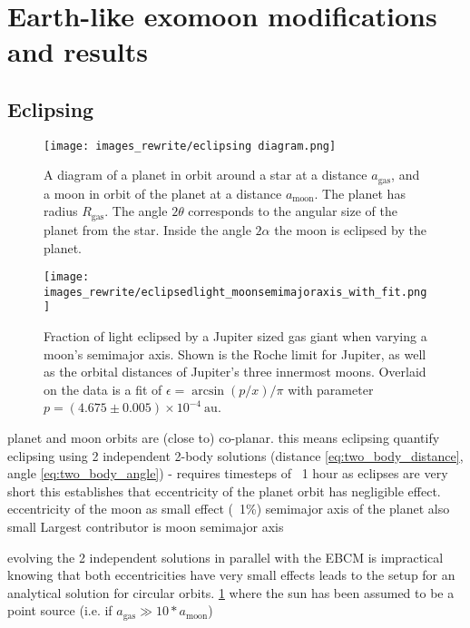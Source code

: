 \documentclass[12pt, onecolumn]{revtex4-2}    %
\begin{document}
\section{Earth-like exomoon modifications and results} \label{sec:Exomoons}
%
\subsection{Eclipsing} \label{ssec:InvEclipsing}
%
\begin{figure}[t]
  \texttt{[image: images\_rewrite/eclipsing diagram.png]}
  \caption{
    A diagram of a planet in orbit around a star at a distance $a_{\text{gas}}$, and a moon in orbit of the planet at a distance $a_{\text{moon}}$.
    The planet has radius $R_\text{gas}$.
    The angle $2\theta$ corresponds to the angular size of the planet from the star.
    Inside the angle $2\alpha$ the moon is eclipsed by the planet.
  }
  \label{fig:quantitative_eclipsing}
\end{figure}

\begin{figure}[t]
  \texttt{[image: images\_rewrite/eclipsedlight\_moonsemimajoraxis\_with\_fit.png]}
  \caption{
    Fraction of light eclipsed by a Jupiter sized gas giant when varying a moon's semimajor axis.
    Shown is the Roche limit for Jupiter, as well as the orbital distances of Jupiter's three innermost moons.
    Overlaid on the data is a fit of $\epsilon = \arcsin(p/x)/\pi$ with parameter $p = (4.675\pm0.005)\times 10^{-4}\ \text{au}$.
  }
  \label{fig:quantitative_eclipsing_moon_semimajor_axis}
\end{figure}

planet and moon orbits are (close to) co-planar.
this means eclipsing
quantify eclipsing using 2 independent 2-body solutions (distance \eqref{eq:two_body_distance}, angle \eqref{eq:two_body_angle})
 - requires timesteps of ~1 hour as eclipses are very short
this establishes that eccentricity of the planet orbit has negligible effect.
eccentricity of the moon as small effect (~1\%)
semimajor axis of the planet also small
Largest contributor is moon semimajor axis

evolving the 2 independent solutions in parallel with the EBCM is impractical
knowing that both eccentricities have very small effects leads to the setup for an analytical solution for circular orbits.
\ref{fig:quantitative_eclipsing}
where the sun has been assumed to be a point source (i.e. if $a_\text{gas} \gg 10*a_\text{moon}$)
\end{document}
